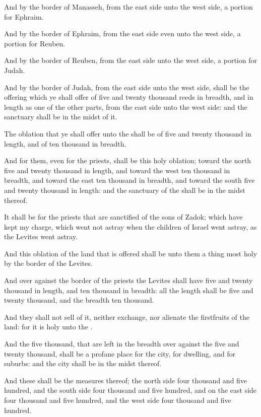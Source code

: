 \Verse And by the border of Manasseh, from the east side unto the west side, a portion for Ephraim.

\Verse And by the border of Ephraim, from the east side even unto the west side, a portion for Reuben.

\Verse And by the border of Reuben, from the east side unto the west side, a portion for Judah.

\Verse And by the border of Judah, from the east side unto the west side, shall be the offering which ye shall offer of five and twenty thousand reeds in breadth, and in length as one of the other parts, from the east side unto the west side: and the sanctuary shall be in the midst of it.

\Verse The oblation that ye shall offer unto the \LORD shall be of five and twenty thousand in length, and of ten thousand in breadth.

\Verse And for them, even for the priests, shall be this holy oblation; toward the north five and twenty thousand in length, and toward the west ten thousand in breadth, and toward the east ten thousand in breadth, and toward the south five and twenty thousand in length: and the sanctuary of the \LORD shall be in the midst thereof.

\Verse It shall be for the priests that are sanctified of the sons of Zadok; which have kept my charge, which went not astray when the children of Israel went astray, as the Levites went astray.

\Verse And this oblation of the land that is offered shall be unto them a thing most holy by the border of the Levites.

\Verse And over against the border of the priests the Levites shall have five and twenty thousand in length, and ten thousand in breadth: all the length shall be five and twenty thousand, and the breadth ten thousand.

\Verse And they shall not sell of it, neither exchange, nor alienate the firstfruits of the land: for it is holy unto the \LORD.

\Verse And the five thousand, that are left in the breadth over against the five and twenty thousand, shall be a profane place for the city, for dwelling, and for suburbs: and the city shall be in the midst thereof.

\Verse And these shall be the measures thereof; the north side four thousand and five hundred, and the south side four thousand and five hundred, and on the east side four thousand and five hundred, and the west side four thousand and five hundred.

